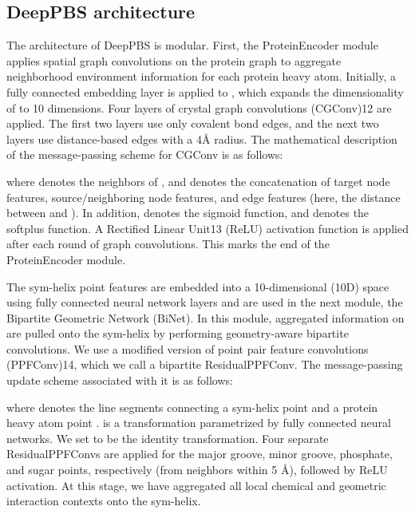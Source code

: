 \subsection{DeepPBS architecture}
The architecture of DeepPBS is modular. First, the ProteinEncoder module applies spatial graph convolutions on the protein graph to aggregate neighborhood environment information for each protein heavy atom. Initially, a fully connected embedding layer is applied to , which expands the dimensionality of  to 10 dimensions. Four layers of crystal graph convolutions (CGConv)12 are applied. The first two layers use only covalent bond edges, and the next two layers use distance-based edges with a 4Å radius. The mathematical description of the message-passing scheme for CGConv is as follows:
        
 
where  denotes the neighbors of , and  denotes the concatenation of target node features, source/neighboring node features, and edge features (here, the distance between  and ). In addition,  denotes the sigmoid function, and  denotes the softplus function. A Rectified Linear Unit13 (ReLU) activation function is applied after each round of graph convolutions. This marks the end of the ProteinEncoder module.

The sym-helix point features  are embedded into a 10-dimensional (10D) space using fully connected neural network layers and are used in the next module, the Bipartite Geometric Network (BiNet). In this module, aggregated information on  are pulled onto the sym-helix by performing geometry-aware bipartite convolutions. We use a modified version of point pair feature convolutions (PPFConv)14, which we call a bipartite ResidualPPFConv. The message-passing update scheme associated with it is as follows: 


where  denotes the line segments connecting a sym-helix point  and a protein heavy atom point .  is a transformation parametrized by fully connected neural networks. We set  to be the identity transformation. Four separate ResidualPPFConvs are applied for the major groove, minor groove, phosphate, and sugar points, respectively (from neighbors within 5 Å), followed by ReLU activation. At this stage, we have aggregated all local chemical and geometric interaction contexts onto the sym-helix.

